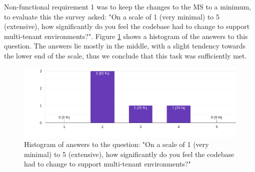 %
%
%
%
%
%


Non-functional requirement 1 was to keep the changes to the MS to a minimum, to evaluate
this the survey asked:
"On a scale of 1 (very minimal) to 5 (extensive), how significantly do you feel the
codebase had to change to support multi-tenant environments?".
Figure \ref{fig:evaluation:non-functional:1} shows a histogram of the answers to this question.
The answers lie mostly in the middle, with a slight tendency towards the lower end of the
scale, thus we conclude that this task was sufficiently met.

\begin{figure}[h]
	\centering
  \includegraphics[scale=0.55]{../../figures/survey/1-changes-ms.png}
	\caption{Histogram of answers to the question: "On a scale of 1 (very minimal) to 5
  (extensive), how significantly do you feel the codebase had to change to support
  multi-tenant environments?"}
	\label{fig:evaluation:non-functional:1}
\end{figure}

